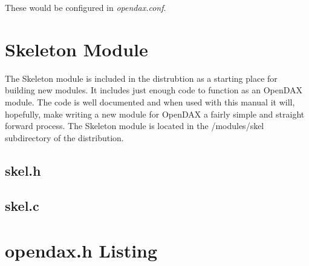 These would be configured in \textit{opendax.conf}.

\appendix



\chapter{Skeleton Module}
The Skeleton module is included in the distrubtion as a starting place for building new modules.  It includes just enough code to function as an OpenDAX module.  The code is well documented and when used with this manual it will, hopefully, make writing a new module for OpenDAX a fairly simple and straight forward process.  The Skeleton module is located in the /modules/skel subdirectory of the distribution.

\section{skel.h}
\begin{small}

\end{small}
\section{skel.c}
\begin{small}

\end{small}


\chapter{opendax.h Listing}
\begin{small}

\end{small}

%

\printindex

